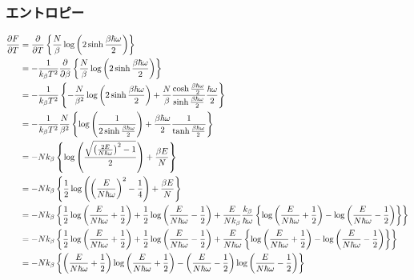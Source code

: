 \documentclass{jsarticle}  %
\numberwithin{equation}{section} %
\numberwithin{figure}{section}
\begin{document}
\subsubsection{エントロピー}
    \begin{align}
        \frac{\partial F}{\partial T} &= \frac{\partial }{\partial T} \left\{ \frac{N}{\beta} \log \left( 2\sinh \frac{\beta \hbar \omega}{2} \right)  \right\} \notag \\
        &= -\frac{1}{k_\beta T^2}\frac{\partial }{\partial \beta} \left\{ \frac{N}{\beta} \log \left( 2\sinh \frac{\beta \hbar \omega}{2} \right)  \right\} \notag \\
        &= -\frac{1}{k_\beta T^2} \left\{ -\frac{N}{\beta^2} \log \left( 2\sinh \frac{\beta \hbar \omega}{2} \right) + \frac{N}{\beta} \frac{\cosh \frac{\beta \hbar \omega}{2}}{\sinh \frac{\beta \hbar \omega}{2} } \frac{\hbar \omega}{2} \right\} \notag \\
        &= -\frac{1}{k_\beta T^2} \frac{N}{\beta^2} \left\{ \log \left( \frac{1}{2\sinh \frac{\beta \hbar \omega}{2}} \right) + \frac{\beta \hbar \omega}{2} \frac{1}{\tanh \frac{\beta \hbar \omega}{2}} \right\}  \\
        &= -Nk_\beta \left\{ \log \left( \frac{\sqrt{ \left( \frac{2E}{N\hbar \omega}\right)^2 - 1}}{2}  \right) + \frac{\beta E}{N}  \right\} \notag \\
        &= -Nk_\beta \left\{ \frac{1}{2} \log \left( \left( \frac{E}{N\hbar \omega}\right)^2 - \frac{1}{4}  \right) + \frac{\beta E}{N} \right\} \notag \\
        &= -Nk_\beta \left\{ \frac{1}{2} \log \left( \frac{E}{N\hbar \omega} + \frac{1}{2}  \right) + \frac{1}{2} \log \left( \frac{E}{N\hbar \omega} - \frac{1}{2}  \right) + \frac{E}{Nk_\beta} \frac{k_\beta}{ \hbar \omega} \left\{ \log \left( \frac{E}{N \hbar \omega} + \frac{1}{2} \right) - \log \left( \frac{E}{N \hbar \omega} - \frac{1}{2} \right) \right\} \right\} \notag \\
        &= -Nk_\beta \left\{ \frac{1}{2} \log \left( \frac{E}{N\hbar \omega} + \frac{1}{2}  \right) + \frac{1}{2} \log \left( \frac{E}{N\hbar \omega} - \frac{1}{2}  \right) + \frac{E}{N\hbar \omega} \left\{ \log \left( \frac{E}{N \hbar \omega} + \frac{1}{2} \right) - \log \left( \frac{E}{N \hbar \omega} - \frac{1}{2} \right) \right\} \right\} \notag \\
        &= -Nk_\beta \left\{ \left( \frac{E}{N\hbar \omega} + \frac{1}{2} \right) \log \left( \frac{E}{N\hbar \omega} + \frac{1}{2} \right) - \left(\frac{E}{N\hbar \omega } -\frac{1}{2} \right)  \log \left( \frac{E}{N\hbar \omega} - \frac{1}{2}  \right) \right\} \notag
    \end{align}
\end{document}
